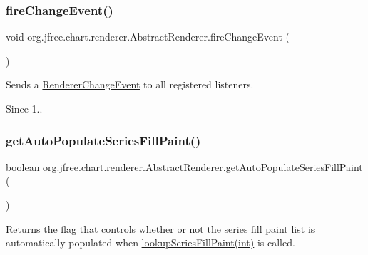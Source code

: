 \subsubsection{\texorpdfstring{fire\+Change\+Event()}{fireChangeEvent()}}
{\footnotesize\ttfamily void org.\+jfree.\+chart.\+renderer.\+Abstract\+Renderer.\+fire\+Change\+Event (\begin{DoxyParamCaption}{ }\end{DoxyParamCaption})\hspace{0.3cm}{\ttfamily [protected]}}

Sends a \mbox{\hyperlink{}{Renderer\+Change\+Event}} to all registered listeners.

\begin{DoxySince}{Since}
1.. 
\end{DoxySince}
\mbox{\label{classorg_1_1jfree_1_1chart_1_1renderer_1_1_abstract_renderer_a8f99b356760b4aab2603c011346359d1}} 
\subsubsection{\texorpdfstring{get\+Auto\+Populate\+Series\+Fill\+Paint()}{getAutoPopulateSeriesFillPaint()}}
{\footnotesize\ttfamily boolean org.\+jfree.\+chart.\+renderer.\+Abstract\+Renderer.\+get\+Auto\+Populate\+Series\+Fill\+Paint (\begin{DoxyParamCaption}{ }\end{DoxyParamCaption})}

Returns the flag that controls whether or not the series fill paint list is automatically populated when \mbox{\hyperlink{classorg_1_1jfree_1_1chart_1_1renderer_1_1_abstract_renderer_a12a702d7b43fac8d70b5c55c03b492fc}{lookup\+Series\+Fill\+Paint(int)}} is called.

